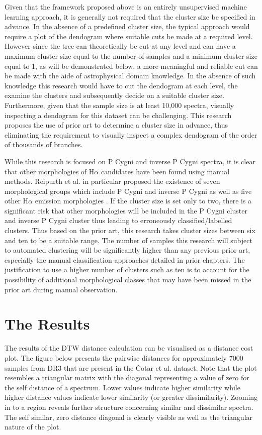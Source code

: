 Given that the framework proposed above is an entirely unsupervised machine learning approach, it is generally not required that the cluster size be specified in advance. In the absence of a predefined cluster size, the typical approach would require a plot of the dendogram where suitable cuts be made at a required level. However since the tree can theoretically be cut at any level and can have a maximum cluster size equal to the number of samples and a minimum cluster size equal to 1, as will be demonstrated below, a more meaningful and reliable cut can be made with the aide of astrophysical domain knowledge. In the absence of such knowledge this research would have to cut the dendogram at each level, the examine the clusters and subsequently decide on a suitable cluster size. Furthermore, given that the sample size is at least 10,000 spectra, visually inspecting a dendogram for this dataset can be challenging. This research proposes the use of prior art to determine a cluster size in advance, thus eliminating the requirement to visually inspect a complex dendogram of the order of thousands of branches. 

While this research is focused on P Cygni and inverse P Cygni spectra, it is clear that other morphologies of H$\alpha$ candidates have been found using manual methods. Reipurth et al. in particular proposed the existence of seven morphological groups which include P Cygni and inverse P Cygni as well as five other H$\alpha$ emission morphologies \cite{reipurth1996halpha}. If the cluster size is set only to two, there is a significant risk that other morphologies will be included in the P Cygni cluster and inverse P Cygni cluster thus leading to erroneously classified/labelled clusters. Thus based on the prior art, this research takes cluster sizes between six and ten to be a suitable range. The number of samples this research will subject to automated clustering will be significantly higher than any previous prior art, especially the manual classification approaches detailed in prior chapters. The justification to use a higher number of clusters such as ten is to account for the possibility of additional morphological classes that may have been missed in the prior art during manual observation. 

\section{The Results}

The results of the DTW distance calculation can be visualised as a distance cost plot. The figure below presents the pairwise distances for approximately 7000 samples from DR3 that are present in the Čotar et al. dataset. Note that the plot resembles a triangular matrix with the diagonal representing a value of zero for the self distance of a spectrum. Lower values indicate higher similarity while higher distance values indicate lower similarity (or greater dissimilarity). Zooming in to a region reveals further structure concerning similar and dissimilar spectra. The self similar, zero distance diagonal is clearly visible as well as the triangular nature of the plot.

